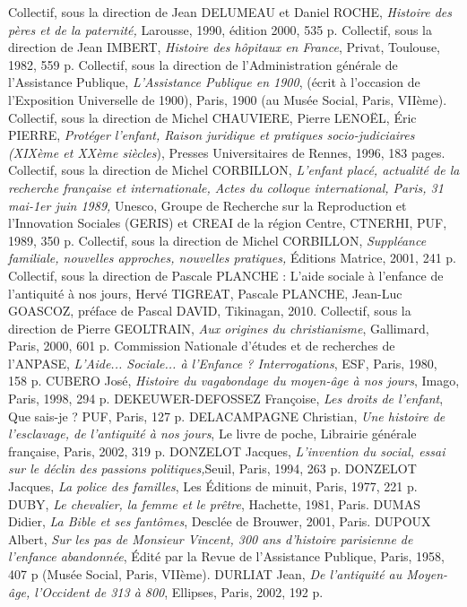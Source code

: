 Collectif, sous la direction de Jean DELUMEAU et Daniel ROCHE, \emph{Histoire des pères et de la paternité,} Larousse, 1990, édition 2000, 535 p.
Collectif, sous la direction de Jean IMBERT, \emph{Histoire des hôpitaux en France}, Privat, Toulouse, 1982, 559 p.
Collectif, sous la direction de l'Administration générale de l'Assistance Publique, \emph{L'Assistance Publique en 1900}, (écrit à l'occasion de l'Exposition Universelle de 1900), Paris, 1900 (au Musée Social, Paris, VIIème).
Collectif, sous la direction de Michel CHAUVIERE, Pierre LENOËL, Éric PIERRE, \emph{Protéger l'enfant, Raison juridique et pratiques socio-judiciaires (XIXème et XXème siècles}), Presses Universitaires de Rennes, 1996, 183 pages.
Collectif, sous la direction de Michel CORBILLON, \emph{L'enfant placé, actualité de la recherche française et internationale, Actes du colloque international, Paris, 31 mai-1er juin 1989,} Unesco, Groupe de Recherche sur la Reproduction et l'Innovation Sociales (GERIS) et CREAI de la région Centre, CTNERHI, PUF, 1989, 350 p.
Collectif, sous la direction de Michel CORBILLON, \emph{Suppléance familiale, nouvelles approches, nouvelles pratiques,} Éditions Matrice, 2001, 241 p.
Collectif, sous la direction de Pascale PLANCHE : L'aide sociale à l'enfance de l'antiquité à nos jours, Hervé TIGREAT, Pascale PLANCHE, Jean-Luc GOASCOZ, préface de Pascal DAVID, Tikinagan, 2010.
Collectif, sous la direction de Pierre GEOLTRAIN, \emph{Aux origines du christianisme}, Gallimard, Paris, 2000, 601 p.
Commission Nationale d'études et de recherches de l'ANPASE, \emph{L'Aide... Sociale... à l'Enfance ? Interrogations}, ESF, Paris, 1980, 158 p.
CUBERO José, \emph{Histoire du vagabondage du moyen-âge à nos jours}, Imago, Paris, 1998, 294 p.
DEKEUWER-DEFOSSEZ Françoise, \emph{Les droits de l'enfant}, Que sais-je ? PUF, Paris, 127 p.
DELACAMPAGNE Christian, \emph{Une histoire de l'esclavage, de l'antiquité à nos jours}, Le livre de poche, Librairie générale française, Paris, 2002, 319 p.
DONZELOT Jacques, \emph{L'invention du social, essai sur le déclin des passions politiques,}Seuil, Paris, 1994, 263 p.
DONZELOT Jacques, \emph{La police des familles}, Les Éditions de minuit, Paris, 1977, 221 p.
DUBY, \emph{Le chevalier, la femme et le prêtre}, Hachette, 1981, Paris. 
DUMAS Didier, \emph{La Bible et ses fantômes}, Desclée de Brouwer, 2001, Paris.
DUPOUX Albert, \emph{Sur les pas de Monsieur Vincent, 300 ans d'histoire parisienne de l'enfance abandonnée}, Édité par la Revue de l'Assistance Publique, Paris, 1958, 407 p (Musée Social, Paris, VIIème).
DURLIAT Jean, \emph{De l'antiquité au Moyen-âge, l'Occident de 313 à 800}, Ellipses, Paris, 2002, 192 p.
